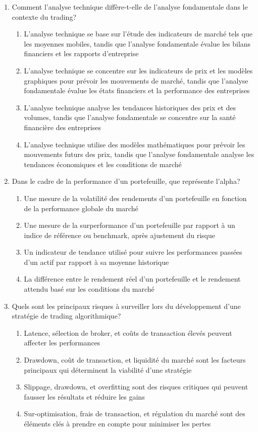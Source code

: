 \documentclass[a4paper,12pt]{article}
\begin{document}
\begin{enumerate}
    \item Comment l'analyse technique diffère-t-elle de l'analyse fondamentale dans le contexte du trading?
    \begin{enumerate}[label=(\Alph*)]
        \item L'analyse technique se base sur l'étude des indicateurs de marché tels que les moyennes mobiles, tandis que l'analyse fondamentale évalue les bilans financiers et les rapports d'entreprise
        \item L'analyse technique se concentre sur les indicateurs de prix et les modèles graphiques pour prévoir les mouvements de marché, tandis que l'analyse fondamentale évalue les états financiers et la performance des entreprises
        \item L'analyse technique analyse les tendances historiques des prix et des volumes, tandis que l'analyse fondamentale se concentre sur la santé financière des entreprises
        \item L'analyse technique utilise des modèles mathématiques pour prévoir les mouvements futurs des prix, tandis que l'analyse fondamentale analyse les tendances économiques et les conditions de marché
    \end{enumerate}

    \item Dans le cadre de la performance d'un portefeuille, que représente l'alpha?
    \begin{enumerate}[label=(\Alph*)]
        \item Une mesure de la volatilité des rendements d'un portefeuille en fonction de la performance globale du marché
        \item Une mesure de la surperformance d'un portefeuille par rapport à un indice de référence ou benchmark, après ajustement du risque
        \item Un indicateur de tendance utilisé pour suivre les performances passées d'un actif par rapport à sa moyenne historique
        \item La différence entre le rendement réel d'un portefeuille et le rendement attendu basé sur les conditions du marché
    \end{enumerate}

    \item Quels sont les principaux risques à surveiller lors du développement d'une stratégie de trading algorithmique?
    \begin{enumerate}[label=(\Alph*)]
        \item Latence, sélection de broker, et coûts de transaction élevés peuvent affecter les performances
        \item Drawdown, coût de transaction, et liquidité du marché sont les facteurs principaux qui déterminent la viabilité d'une stratégie
        \item Slippage, drawdown, et overfitting sont des risques critiques qui peuvent fausser les résultats et réduire les gains
        \item Sur-optimisation, frais de transaction, et régulation du marché sont des éléments clés à prendre en compte pour minimiser les pertes
    \end{enumerate}


\end{enumerate}
\end{document}

